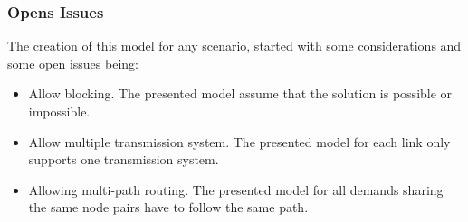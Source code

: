 \subsubsection{Opens Issues}

The creation of this model for any scenario, started with some considerations and some open issues being:

\begin{itemize}
  \item Allow blocking.
  \subitem The presented model assume that the solution is possible or impossible.
  \item Allow multiple transmission system.
  \subitem The presented model for each link only supports one transmission system.
  \item Allowing multi-path routing.
  \subitem The presented model for all demands sharing the same node pairs have to follow the same path.
\end{itemize} 